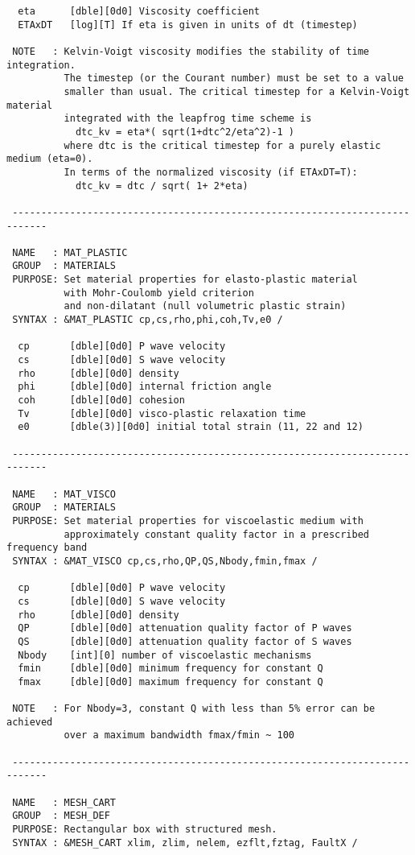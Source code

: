 \begin{verbatim}
  eta      [dble][0d0] Viscosity coefficient
  ETAxDT   [log][T] If eta is given in units of dt (timestep)

 NOTE   : Kelvin-Voigt viscosity modifies the stability of time integration.
          The timestep (or the Courant number) must be set to a value
          smaller than usual. The critical timestep for a Kelvin-Voigt material 
          integrated with the leapfrog time scheme is
            dtc_kv = eta*( sqrt(1+dtc^2/eta^2)-1 )
          where dtc is the critical timestep for a purely elastic medium (eta=0).
          In terms of the normalized viscosity (if ETAxDT=T):
            dtc_kv = dtc / sqrt( 1+ 2*eta)

 ----------------------------------------------------------------------------

 NAME   : MAT_PLASTIC
 GROUP  : MATERIALS
 PURPOSE: Set material properties for elasto-plastic material
          with Mohr-Coulomb yield criterion
          and non-dilatant (null volumetric plastic strain)
 SYNTAX : &MAT_PLASTIC cp,cs,rho,phi,coh,Tv,e0 /

  cp       [dble][0d0] P wave velocity
  cs       [dble][0d0] S wave velocity
  rho      [dble][0d0] density
  phi      [dble][0d0] internal friction angle
  coh      [dble][0d0] cohesion
  Tv       [dble][0d0] visco-plastic relaxation time
  e0       [dble(3)][0d0] initial total strain (11, 22 and 12)

 ----------------------------------------------------------------------------

 NAME   : MAT_VISCO
 GROUP  : MATERIALS
 PURPOSE: Set material properties for viscoelastic medium with
          approximately constant quality factor in a prescribed frequency band
 SYNTAX : &MAT_VISCO cp,cs,rho,QP,QS,Nbody,fmin,fmax /

  cp       [dble][0d0] P wave velocity
  cs       [dble][0d0] S wave velocity
  rho      [dble][0d0] density
  QP       [dble][0d0] attenuation quality factor of P waves
  QS       [dble][0d0] attenuation quality factor of S waves
  Nbody    [int][0] number of viscoelastic mechanisms
  fmin     [dble][0d0] minimum frequency for constant Q
  fmax     [dble][0d0] maximum frequency for constant Q

 NOTE   : For Nbody=3, constant Q with less than 5% error can be achieved
          over a maximum bandwidth fmax/fmin ~ 100

 ----------------------------------------------------------------------------

 NAME   : MESH_CART
 GROUP  : MESH_DEF
 PURPOSE: Rectangular box with structured mesh.
 SYNTAX : &MESH_CART xlim, zlim, nelem, ezflt,fztag, FaultX /


\end{verbatim}
